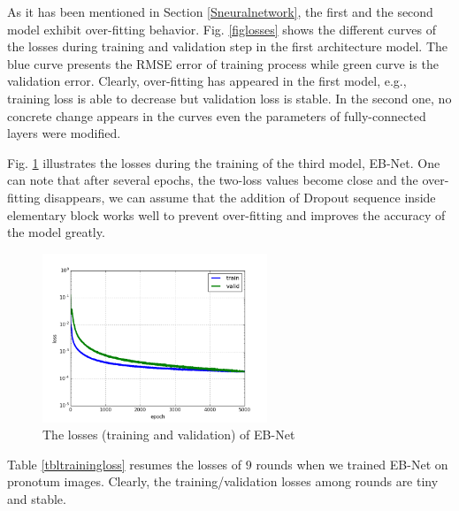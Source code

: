 \documentclass[review]{elsarticle}
\begin{document}
As it has been mentioned in Section \ref{Sneuralnetwork}, the first
and the second model exhibit over-fitting
behavior. Fig. \ref{figlosses} shows the different curves of the
losses during training and validation step in the first architecture model. The blue curve presents
the RMSE error of training process while green curve is the
validation error. Clearly, over-fitting has appeared in the first
model, e.g., training loss is able to decrease but validation
loss is stable. In the second one, no concrete change appears in the curves even the parameters of fully-connected layers were modified.

Fig. \ref{figloss3} illustrates the losses during the training of the
third model, EB-Net. One can note that after several epochs, the
two-loss values become close and the over-fitting disappears, we can
assume that the addition of Dropout sequence inside elementary block works well to prevent over-fitting and improves the accuracy of the model greatly.

\begin{figure}[h!]
    \centering
    \includegraphics[width=0.6\textwidth]{images/model3_loss}
    \caption{The losses (training and validation) of EB-Net}
    \label{figloss3}
\end{figure}

Table \ref{tbltrainingloss} resumes the losses of $9$ rounds when we
trained EB-Net on pronotum images. Clearly, the training/validation
losses among rounds are tiny and stable.
\end{document}

